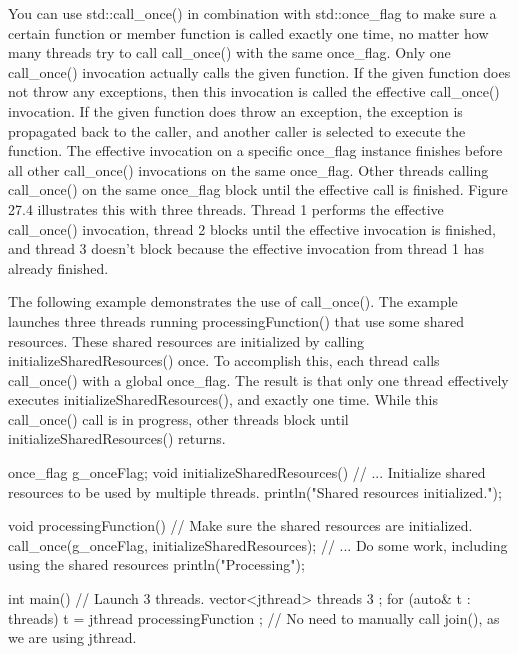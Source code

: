 You can use std::call\_once() in combination with std::once\_flag to make sure a certain function or member function is called exactly one time, no matter how many threads try to call call\_once() with the same once\_flag. Only one call\_once() invocation actually calls the given function. If the given function does not throw any exceptions, then this invocation is called the effective call\_once() invocation. If the given function does throw an exception, the exception is propagated back to the caller, and another caller is selected to execute the function. The effective invocation on a specific once\_flag instance finishes before all other call\_once() invocations on the same once\_flag. Other threads calling call\_once() on the same once\_flag block until the effective call is finished. Figure 27.4 illustrates this with three threads. Thread 1 performs the effective call\_once() invocation, thread 2 blocks until the effective invocation is finished, and thread 3 doesn’t block because the effective invocation from thread 1 has already finished.


The following example demonstrates the use of call\_once(). The example launches three threads running processingFunction() that use some shared resources. These shared resources are initialized by calling initializeSharedResources() once. To accomplish this, each thread calls call\_once() with a global once\_flag. The result is that only one thread effectively executes initializeSharedResources(), and exactly one time. While this call\_once() call is in progress, other threads block until initializeSharedResources() returns.

\begin{cpp}
once_flag g_onceFlag;
void initializeSharedResources()
{
    // ... Initialize shared resources to be used by multiple threads.
    println("Shared resources initialized.");
}

void processingFunction()
{
    // Make sure the shared resources are initialized.
    call_once(g_onceFlag, initializeSharedResources);
    // ... Do some work, including using the shared resources
    println("Processing");
}

int main()
{
    // Launch 3 threads.
    vector<jthread> threads { 3 };
    for (auto& t : threads) {
        t = jthread { processingFunction };
    }
    // No need to manually call join(), as we are using jthread.
}
\end{cpp}


